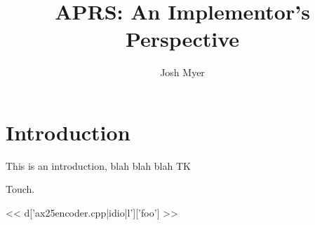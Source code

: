 \documentclass{article}
\title{APRS: An Implementor's Perspective}
\author{Josh Myer}
\begin{document}
\maketitle


\section{Introduction}

This is an introduction, blah blah blah TK

Touch.

<< d['ax25encoder.cpp|idio|l']['foo'] >>
\end{document}
